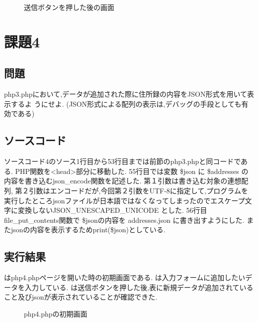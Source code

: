 \documentclass[a4j,10pt]{jsarticle}
\begin{document}
\begin{figure}[H]
  \centering
  \caption{送信ボタンを押した後の画面}
\label{fig:fig5}
\end{figure}


\section{課題4}

\subsection{問題}


php3.phpにおいて,データが追加された際に住所録の内容をJSON形式を用いて表示するよ
うにせよ.
(JSON形式による配列の表示は,デバッグの手段としても有効である)

\subsection{ソースコード}

ソースコード4のソース1行目から53行目までは前節のphp3.phpと同コードである. PHP関数を<head>部分に移動した.
55行目では変数 \$json に \$addresses の内容を書き込むjson\_encode関数を記述した. 第１引数は書き込む対象の連想配列,
第２引数はエンコードだが,今回第２引数をUTF-8に指定して,プログラムを実行したところjsonファイルが日本語ではなくなってしまったのでエスケープ文字に変換しないJSON\_UNESCAPED\_UNICODE とした.
56行目file\_put\_contents関数で \$jsonの内容を addresses.json に書き出すようにした. またjsonの内容を表示するためprint(\$json)としている.


\subsection{実行結果}

はphp4.phpページを開いた時の初期画面である.
は入力フォームに追加したいデータを入力している.
は送信ボタンを押した後,表に新規データが追加されていること及びjsonが表示されていることが確認できた.

\begin{figure}[H]
  \centering
  \caption{php4.phpの初期画面}
\label{fig:fig6}
\end{figure}
\end{document}
